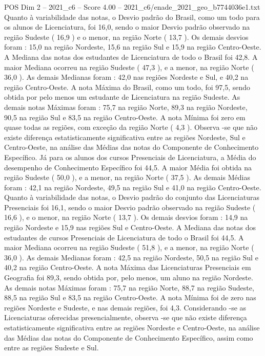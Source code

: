\begin{textsample}{POS Dim 2 – 2021\_c6 – Score 4.00 – 2021\_c6/enade\_2021\_geo\_b7744036e1.txt}
Quanto à variabilidade das notas, o Desvio padrão do Brasil, como um todo para os alunos de Licenciatura, foi 16,0, sendo o maior Desvio padrão observado na região Sudeste ( 16,9 ) e o menor, na região Norte ( 13,7 ).
Os demais desvios foram : 15,0 na região Nordeste, 15,6 na região Sul e 15,9 na região Centro-Oeste.
A Mediana das notas dos estudantes de Licenciatura de todo o Brasil foi 42,8.
A maior Mediana ocorreu na região Sudeste ( 47,3 ), e a menor, na região Norte ( 36,0 ).
As demais Medianas foram : 42,0 nas regiões Nordeste e Sul, e 40,2 na região Centro-Oeste.
A nota Máxima do Brasil, como um todo, foi 97,5, sendo obtida por pelo menos um estudante de Licenciatura na região Sudeste.
As demais notas Máximas foram : 75,7 na região Norte, 89,3 na região Nordeste, 90,5 na região Sul e 83,5 na região Centro-Oeste.
A nota Mínima foi zero em quase todas as regiões, com exceção da região Norte ( 4,3 ).
Observa -se que não existe diferença estatisticamente significativa entre as regiões Nordeste, Sul e Centro-Oeste, na análise das Médias das notas do Componente de Conhecimento Específico.
Já para os alunos dos cursos Presenciais de Licenciatura, a Média do desempenho de Conhecimento Específico foi 44,5.
A maior Média foi obtida na região Sudeste ( 50,0 ), e a menor, na região Norte ( 37,5 ).
As demais Médias foram : 42,1 na região Nordeste, 49,5 na região Sul e 41,0 na região Centro-Oeste.
Quanto à variabilidade das notas, o Desvio padrão do conjunto das Licenciaturas Presenciais foi 16,1, sendo o maior Desvio padrão observado na região Sudeste ( 16,6 ), e o menor, na região Norte ( 13,7 ).
Os demais desvios foram : 14,9 na região Nordeste e 15,9 nas regiões Sul e Centro-Oeste.
A Mediana das notas dos estudantes de cursos Presenciais de Licenciatura de todo o Brasil foi 44,5.
A maior Mediana ocorreu na região Sudeste ( 51,8 ), e a menor, na região Norte ( 36,0 ).
As demais Medianas foram : 42,5 na região Nordeste, 50,5 na região Sul e 40,2 na região Centro-Oeste.
A nota Máxima das Licenciaturas Presenciais em Geografia foi 89,3, sendo obtida por, pelo menos, um aluno na região Nordeste.
As demais notas Máximas foram : 75,7 na região Norte, 88,7 na região Sudeste, 88,5 na região Sul e 83,5 na região Centro-Oeste.
A nota Mínima foi de zero nas regiões Nordeste e Sudeste, e nas demais regiões, foi 4,3.
Considerando -se as Licenciaturas oferecidas presencialmente, observa -se que não existe diferença estatisticamente significativa entre as regiões Nordeste e Centro-Oeste, na análise das Médias das notas do Componente de Conhecimento Específico, assim como entre as regiões Sudeste e Sul.

\end{textsample}
